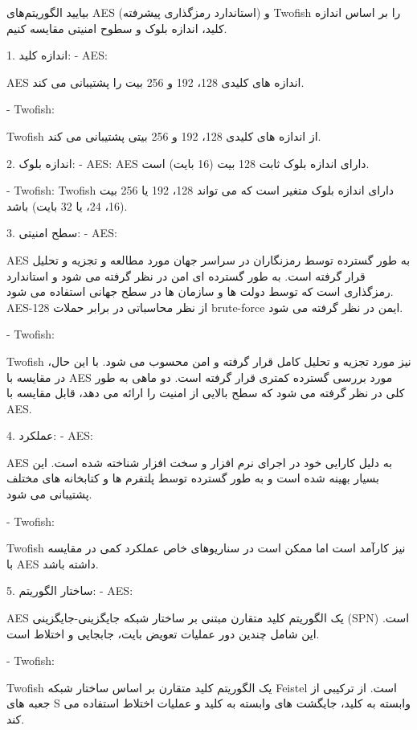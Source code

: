 \begin{boxB}
    بیایید الگوریتم‌های AES (استاندارد رمزگذاری پیشرفته) و Twofish را بر اساس اندازه کلید، اندازه بلوک و سطوح امنیتی مقایسه کنیم.
    
1. اندازه کلید:
    - AES: 
    
    AES اندازه های کلیدی 128، 192 و 256 بیت را پشتیبانی می کند.
    
    - Twofish:
    
    Twofish از اندازه های کلیدی 128، 192 و 256 بیتی پشتیبانی می کند.

2. اندازه بلوک:
    - AES:
    AES دارای اندازه بلوک ثابت 128 بیت (16 بایت) است.
    
    - Twofish:
    Twofish دارای اندازه بلوک متغیر است که می تواند 128، 192 یا 256 بیت (16، 24، یا 32 بایت) باشد.


3. سطح امنیتی:
    - AES:
    
    AES به طور گسترده توسط رمزنگاران در سراسر جهان مورد مطالعه و تجزیه و تحلیل قرار گرفته است. به طور گسترده ای امن در نظر گرفته می شود و استاندارد رمزگذاری است که توسط دولت ها و سازمان ها در سطح جهانی استفاده می شود. AES-128 از نظر محاسباتی در برابر حملات brute-force ایمن در نظر گرفته می شود.
    
    - Twofish:
    
    Twofish نیز مورد تجزیه و تحلیل کامل قرار گرفته و امن محسوب می شود. با این حال، در مقایسه با AES مورد بررسی گسترده کمتری قرار گرفته است. دو ماهی به طور کلی در نظر گرفته می شود که سطح بالایی از امنیت را ارائه می دهد، قابل مقایسه با AES.


4. عملکرد:
    - AES: 
    
    AES به دلیل کارایی خود در اجرای نرم افزار و سخت افزار شناخته شده است. این بسیار بهینه شده است و به طور گسترده توسط پلتفرم ها و کتابخانه های مختلف پشتیبانی می شود.
    
    - Twofish:
    
    Twofish نیز کارآمد است اما ممکن است در سناریوهای خاص عملکرد کمی در مقایسه با AES داشته باشد.



5. ساختار الگوریتم:
    - AES:
    
    AES یک الگوریتم کلید متقارن مبتنی بر ساختار شبکه جایگزینی-جایگزینی (SPN) است. این شامل چندین دور عملیات تعویض بایت، جابجایی و اختلاط است.
    
    - Twofish:
    
    Twofish یک الگوریتم کلید متقارن بر اساس ساختار شبکه Feistel است. از ترکیبی از جعبه های S وابسته به کلید، جایگشت های وابسته به کلید و عملیات اختلاط استفاده می کند.



\end{boxB}
